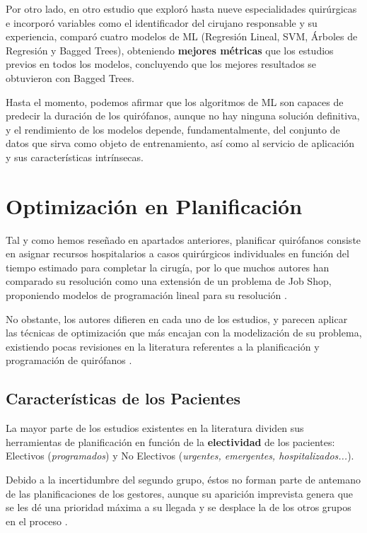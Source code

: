 Por otro lado, en otro estudio que exploró hasta nueve especialidades quirúrgicas \cite{Martinez2021MachinePrediction} e incorporó variables como el identificador del cirujano responsable y su experiencia, comparó cuatro modelos de ML (Regresión Lineal, SVM, Árboles de Regresión y Bagged Trees), obteniendo \textbf{mejores métricas} que los estudios previos en todos los modelos, concluyendo que los mejores resultados se obtuvieron con Bagged Trees.

Hasta el momento, podemos afirmar que los algoritmos de ML son capaces de predecir la duración de los quirófanos, aunque no hay ninguna solución definitiva, y el rendimiento de los modelos depende, fundamentalmente, del conjunto de datos que sirva como objeto de entrenamiento, así como al servicio de aplicación y sus características intrínsecas.

\newpage
\section{Optimización en Planificación}
Tal y como hemos reseñado en apartados anteriores, planificar quirófanos consiste en asignar recursos hospitalarios a casos quirúrgicos individuales en función del tiempo estimado para completar la cirugía, por lo que muchos autores han comparado su resolución como una extensión de un problema de Job Shop, proponiendo modelos de programación lineal para su resolución \cite{Pham2008SurgicalProblem} .

No obstante, los autores difieren en cada uno de los estudios, y parecen aplicar las técnicas de optimización que más encajan con la modelización de su problema, existiendo pocas revisiones en la literatura referentes a la planificación y programación de quirófanos \cite{Gur2018ApplicationOverview}. 

\subsection{Características de los Pacientes}
La mayor parte de los estudios existentes en la literatura dividen sus herramientas de planificación en función de la \textbf{electividad} de los pacientes: Electivos (\textit{programados}) y No Electivos (\textit{urgentes, emergentes, hospitalizados...}).

Debido a la incertidumbre del segundo grupo, éstos no forman parte de antemano de las planificaciones de los gestores, aunque su aparición imprevista genera que se les dé una prioridad máxima a su llegada y se desplace la de los otros grupos en el proceso \cite{CAYIRLI2009OUTPATIENTLITERATURE} .

